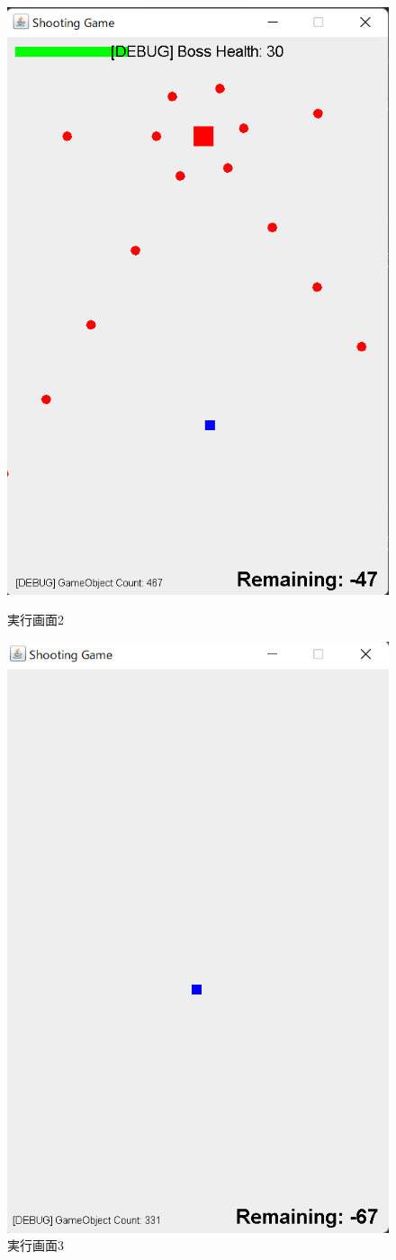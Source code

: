 \documentclass[dvipdfmx]{jlreq}
\begin{document}
\begin{figure}[H]
\begin{minipage}[b]{0.32\columnwidth}
    \includegraphics[width=0.7\columnwidth]{figures/result3.png}
    \caption{実行画面2}
    \label{fig:b}
\end{minipage}
\begin{minipage}[b]{0.32\columnwidth}
    \centering
    \includegraphics[width=0.7\columnwidth]{figures/result4.png}
    \caption{実行画面3}
    \label{fig:c}
\end{minipage}
\end{figure}
\end{document}

